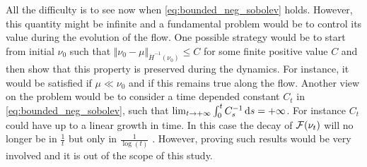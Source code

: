 All the difficulty is to see now when \cref{eq:bounded_neg_sobolev} holds. However, this quantity might be infinite  and a fundamental problem would be to control its value during the evolution of the flow. One possible strategy would be to start from initial $\nu_0$ such that $\Vert \nu_0  - \mu \Vert_{\dot{H}^{-1}(\nu_0)} \leq C $  for some finite positive value $C$ and then show that this property is preserved during the dynamics. For instance, it would be satisfied if $\mu \ll \nu_0$ and if this remains true along the flow. Another view on the problem would be to consider a time depended constant $C_t$ in \cref{eq:bounded_neg_sobolev}, such that $	\lim_{t\rightarrow +\infty} \int_0^t C_s^{-1}\mathop{}\!\mathrm{d} s = +\infty$.
For instance $C_t$ could have up to a linear growth in time. In this case the decay of ${{\mathcal F}}(\nu_t)$ will no longer be in $\frac{1}{t}$ but only in $\frac{1}{\log(t)}$ . However, proving such results would be very involved and it is out of the scope of this study.


 








